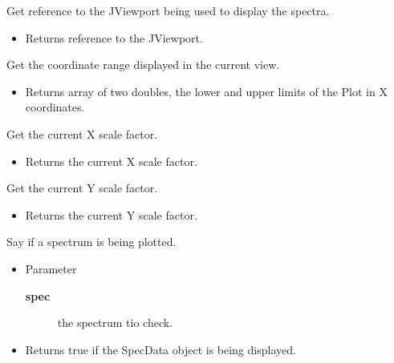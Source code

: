 \begin{desc}Get reference to the JViewport being used to display the
 spectra.
\begin{itemize}
\item{Returns reference to the JViewport. }
\end{itemize}
\end{desc}

\begin{desc}Get the coordinate range displayed in the current view.
\begin{itemize}
\item{Returns array of two doubles, the lower and upper limits of the
        Plot in X coordinates. }
\end{itemize}
\end{desc}

\begin{desc}Get the current X scale factor.
\begin{itemize}
\item{Returns the current X scale factor. }
\end{itemize}
\end{desc}

\begin{desc}Get the current Y scale factor.
\begin{itemize}
\item{Returns the current Y scale factor. }
\end{itemize}
\end{desc}

\begin{desc}Say if a spectrum is being plotted.
\begin{itemize}
\item{Parameter
  \begin{description}
   \item[\textbf{spec}]{the spectrum tio check.}
  \end{description}}
\end{itemize}
\begin{itemize}
\item{Returns true if the SpecData object is being displayed. }
\end{itemize}
\end{desc}

